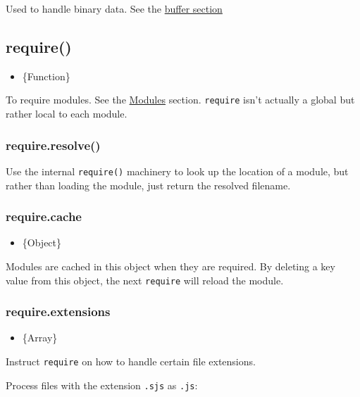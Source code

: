 Used to handle binary data. See the \href{buffer.html}{buffer section}

\subsection{require()}

\begin{itemize}
\item
  \{Function\}
\end{itemize}

To require modules. See the
\href{modules.html\#modules\_modules}{Modules} section. \texttt{require}
isn't actually a global but rather local to each module.

\subsubsection{require.resolve()}

Use the internal \texttt{require()} machinery to look up the location of
a module, but rather than loading the module, just return the resolved
filename.

\subsubsection{require.cache}

\begin{itemize}
\item
  \{Object\}
\end{itemize}

Modules are cached in this object when they are required. By deleting a
key value from this object, the next \texttt{require} will reload the
module.

\subsubsection{require.extensions}

\begin{itemize}
\item
  \{Array\}
\end{itemize}

Instruct \texttt{require} on how to handle certain file extensions.

Process files with the extension \texttt{.sjs} as \texttt{.js}:

\begin{Shaded}
\begin{Highlighting}[]
\NormalTok{[}\NormalTok{] = }\NormalTok{[}\NormalTok{];}
\end{Highlighting}
\end{Shaded}


